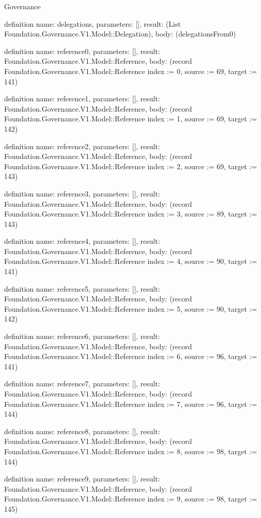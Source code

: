 \begin{lexlean}{Governance}
\begin{semanticmodule}
definition{
  name: delegations,
  parameters: [],
  result: (List Foundation.Governance.V1.Model::Delegation),
  body: (delegationsFrom0)
}

definition{
  name: reference0,
  parameters: [],
  result: Foundation.Governance.V1.Model::Reference,
  body: (record Foundation.Governance.V1.Model::Reference {index := 0, source := 69, target := 141})
}

definition{
  name: reference1,
  parameters: [],
  result: Foundation.Governance.V1.Model::Reference,
  body: (record Foundation.Governance.V1.Model::Reference {index := 1, source := 69, target := 142})
}

definition{
  name: reference2,
  parameters: [],
  result: Foundation.Governance.V1.Model::Reference,
  body: (record Foundation.Governance.V1.Model::Reference {index := 2, source := 69, target := 143})
}

definition{
  name: reference3,
  parameters: [],
  result: Foundation.Governance.V1.Model::Reference,
  body: (record Foundation.Governance.V1.Model::Reference {index := 3, source := 89, target := 143})
}

definition{
  name: reference4,
  parameters: [],
  result: Foundation.Governance.V1.Model::Reference,
  body: (record Foundation.Governance.V1.Model::Reference {index := 4, source := 90, target := 141})
}

definition{
  name: reference5,
  parameters: [],
  result: Foundation.Governance.V1.Model::Reference,
  body: (record Foundation.Governance.V1.Model::Reference {index := 5, source := 90, target := 142})
}

definition{
  name: reference6,
  parameters: [],
  result: Foundation.Governance.V1.Model::Reference,
  body: (record Foundation.Governance.V1.Model::Reference {index := 6, source := 96, target := 141})
}

definition{
  name: reference7,
  parameters: [],
  result: Foundation.Governance.V1.Model::Reference,
  body: (record Foundation.Governance.V1.Model::Reference {index := 7, source := 96, target := 144})
}

definition{
  name: reference8,
  parameters: [],
  result: Foundation.Governance.V1.Model::Reference,
  body: (record Foundation.Governance.V1.Model::Reference {index := 8, source := 98, target := 144})
}

definition{
  name: reference9,
  parameters: [],
  result: Foundation.Governance.V1.Model::Reference,
  body: (record Foundation.Governance.V1.Model::Reference {index := 9, source := 98, target := 145})
}


\end{semanticmodule}
\end{lexlean}
